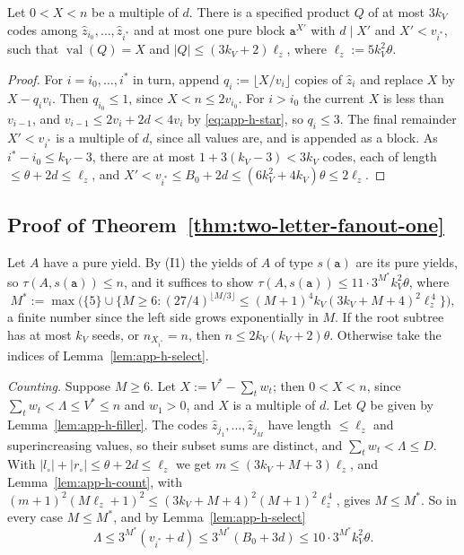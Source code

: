 \begin{lemma}[Filler]
\label{lem:app-h-filler}
Let $0<X<n$ be a multiple of $d$.  There is a specified product $Q$ of at most
$3k_V$ codes among $\hat z_{i_0},\ldots,\hat z_{i^*}$ and at most one pure block
$\mathtt a^{X'}$ with $d\mid X'$ and $X'<v_{i^*}$, such that
$\operatorname{val}(Q)=X$ and $|Q|\le(3k_V+2)\ell_z$, where
$\ell_z:=5k_V^2\theta$.
\end{lemma}

\begin{proof}
For $i=i_0,\ldots,i^*$ in turn, append $q_i:=\lfloor X/v_i\rfloor$ copies of
$\hat z_i$ and replace $X$ by $X-q_iv_i$.  Then $q_{i_0}\le1$, since
$X<n\le2v_{i_0}$.  For $i>i_0$ the current $X$ is less than $v_{i-1}$, and
$v_{i-1}\le2v_i+2d<4v_i$ by \eqref{eq:app-h-star}, so $q_i\le3$.  The final
remainder $X'<v_{i^*}$ is a multiple of $d$, since all values are, and is
appended as a block.  As $i^*-i_0\le k_V-3$, there are at most
$1+3(k_V-3)<3k_V$ codes, each of length $\le\theta+2d\le\ell_z$, and
$X'<v_{i^*}\le B_0+2d\le(6k_V^2+4k_V)\theta\le2\ell_z$.
\end{proof}

\subsection{Proof of Theorem~\ref{thm:two-letter-fanout-one}}

Let $A$ have a pure yield.  By (I1) the yields of $A$ of type $s(\mathtt a)$
are its pure yields, so $\tau(A,s(\mathtt a))\le n$, and it suffices to show
$\tau(A,s(\mathtt a))\le11\cdot3^{M^*}k_V^2\theta$, where
\[
 M^*:=\max\bigl(\{5\}\cup\{M\ge6:(27/4)^{\lfloor M/3\rfloor}
 \le(M+1)^4k_V(3k_V+M+4)^2\ell_z^{\,4}\}\bigr),
\]
a finite number since the left side grows exponentially in $M$.  If the root
subtree has at most $k_V$ seeds, or $n_{X_{i^*}}=n$, then $n\le2k_V(k_V+2)\theta$.
Otherwise take the indices of Lemma~\ref{lem:app-h-select}.

\emph{Counting.}  Suppose $M\ge6$.  Let $X:=V^*-\sum_tw_t$; then $0<X<n$, since
$\sum_tw_t<\Lambda\le V^*\le n$ and $w_1>0$, and $X$ is a multiple of $d$.  Let
$Q$ be given by Lemma~\ref{lem:app-h-filler}.  The codes $\hat z_{j_1},\ldots,\hat
z_{j_M}$ have length $\le\ell_z$ and superincreasing values, so their subset
sums are distinct, and $\sum_tw_t<\Lambda\le D$.  With
$|l_\circ|+|r_\circ|\le\theta+2d\le\ell_z$ we get
$m\le(3k_V+M+3)\ell_z$, and Lemma~\ref{lem:app-h-count}, with
$(m+1)^2(M\ell_z+1)^2\le(3k_V+M+4)^2(M+1)^2\ell_z^{\,4}$, gives $M\le M^*$.  So in
every case $M\le M^*$, and by Lemma~\ref{lem:app-h-select}
\[
 \Lambda\le3^{M^*}(v_{i^*}+d)\le3^{M^*}(B_0+3d)\le10\cdot3^{M^*}k_V^2\theta .
\]

